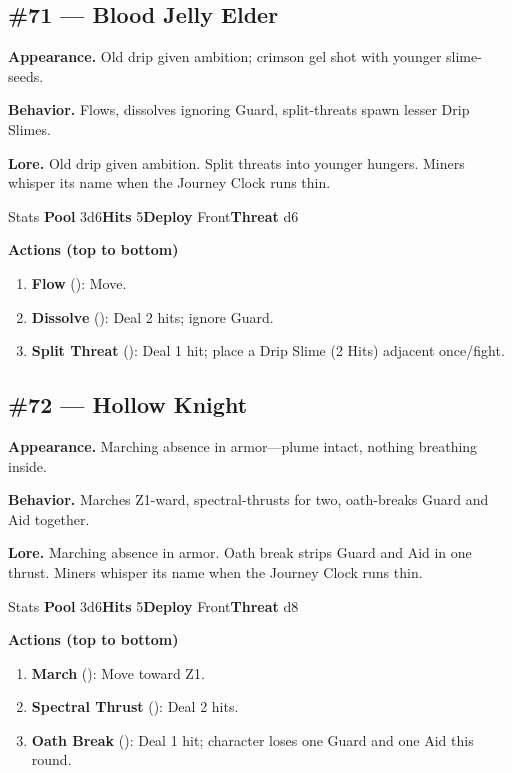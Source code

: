 \subsection*{\#71 --- Blood Jelly Elder}

\textbf{Appearance.} Old drip given ambition; crimson gel shot with younger slime-seeds.

\textbf{Behavior.} Flows, dissolves ignoring Guard, split-threats spawn lesser Drip Slimes.

\textbf{Lore.} Old drip given ambition. Split threats into younger hungers. Miners whisper its name when the Journey Clock runs thin.

\begin{monsterentry}{Stats}
\textbf{Pool} 3d6\quad\textbf{Hits} 5\quad\textbf{Deploy} Front\quad\textbf{Threat} d6

\textbf{Actions (top to bottom)}
\begin{enumerate}\setlength{\itemsep}{0.15em}\setlength{\parskip}{0pt}
  \item \textbf{Flow} (\easy): Move.
  \item \textbf{Dissolve} (\medium): Deal 2 hits; ignore Guard.
  \item \textbf{Split Threat} (\hard): Deal 1 hit; place a Drip Slime (2 Hits) adjacent once/fight.
\end{enumerate}
\end{monsterentry}

\subsection*{\#72 --- Hollow Knight}

\textbf{Appearance.} Marching absence in armor---plume intact, nothing breathing inside.

\textbf{Behavior.} Marches Z1-ward, spectral-thrusts for two, oath-breaks Guard and Aid together.

\textbf{Lore.} Marching absence in armor. Oath break strips Guard and Aid in one thrust. Miners whisper its name when the Journey Clock runs thin.

\begin{monsterentry}{Stats}
\textbf{Pool} 3d6\quad\textbf{Hits} 5\quad\textbf{Deploy} Front\quad\textbf{Threat} d8

\textbf{Actions (top to bottom)}
\begin{enumerate}\setlength{\itemsep}{0.15em}\setlength{\parskip}{0pt}
  \item \textbf{March} (\easy): Move toward Z1.
  \item \textbf{Spectral Thrust} (\medium): Deal 2 hits.
  \item \textbf{Oath Break} (\hard): Deal 1 hit; character loses one Guard and one Aid this round.
\end{enumerate}
\end{monsterentry}

